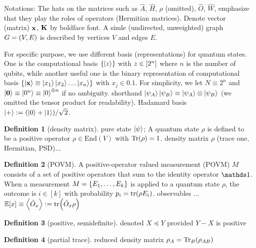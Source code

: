 \documentclass[
10pt,
aps,
pra,
linenumbers,
floatfix,
]{revtex4-2}
\theoremstyle{plain}
\theoremstyle{definition}
\newtheorem{definition}{Definition}
\newcommand{\ew}{\hat{W}}
\newcommand{\ob}{\hat{O}}
\newcommand{\hamiltonian}{\hat{H}}
\newcommand{\dm}{\rho}
\begin{document}
Notations: 
The hats on the matrices such as $\hat{A}$, $\hamiltonian$, $\dm$ (omitted), $\ob$, $\ew$, emphasize that they play the roles of operators (Hermitian matrices).
Denote vector (matrix) $\vb{x}$, $\vb{K}$ by boldface font.
A simle (undirected, unweighted) graph $G=(V,E)$ is described by vertices $V$ and edges $E$.

For specific purpose, we use different basis (representations) for quantum states.
One is the computational basis $\qty{\ket{z}}$ with $z\in \qty[2^n]$ where $n$ is the number of qubits,
while another useful one is the binary representation of computational basis $\qty{\ket{\vb{x}}\equiv\ket{x_1}\ket{x_2}\dots\ket{x_n}}$ with $x_j\in \qty{0,1}$. 
For simplicity, we let $N \equiv 2^n$ and $\ket{\vb{0}}\equiv\ket{0^n} \equiv\ket{0}^{\otimes n}$ if no ambiguity.
shorthand $\ket{\psi_A}\ket{\psi_B}\equiv \ket{\psi_A}\otimes \ket{\psi_B}$ (we omitted the tensor product for readability).
Hadamard basis $\ket{+}: = (\ket{0}+\ket{1})/\sqrt{2} $.
\begin{definition}[density matrix]\label{def:density_matrix}
	pure state $\ket{\psi}$;
	A quantum state $\dm$ is defined to be a positive operator $ \dm \in \text{End}(V )$ with $\Tr( \dm ) = 1$.
	density matrix $\dm$ (trace one, Hermitian, PSD)...
\end{definition}
\begin{definition}[POVM]\label{def:povm}
	A positive-operator valued measurement (POVM) $M$ consists of a set of positive operators that sum to the identity operator $\identity$. 
	When a measurement $M = \qty{ E_1 , \dots , E_k }$ is applied to a quantum state $\dm$, the outcome is $i \in [k]$ with probability $p_i = \tr( \dm E_i )$.
	observables ... $\expectation[x]\equiv\expval{\ob_x}:=\tr(\ob_x\dm)$
\end{definition}
\begin{definition}[positive, semidefinite]\label{def:psd}
	denoted $X \preceq Y $ provided $Y-X $ is positive
\end{definition}
\begin{definition}[partial trace]\label{def:partial_trace}
	reduced density matrix $\dm_A = \Tr_B(\dm_{AB})$
\end{definition}
\end{document}
